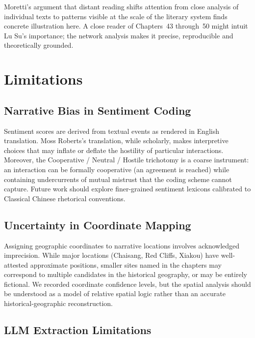 \documentclass[12pt, a4paper]{article}
\begin{document}
Moretti's argument that distant reading shifts attention from close analysis
of individual texts to patterns visible at the scale of the literary system
\autocite{moretti2005graphs} finds concrete illustration here.
A close reader of Chapters~43 through~50 might intuit Lu Su's importance;
the network analysis makes it precise, reproducible and theoretically
grounded.

\section{Limitations}
\label{sec:limitations}

\subsection{Narrative Bias in Sentiment Coding}

Sentiment scores are derived from textual events as rendered in English
translation.
Moss Roberts's translation, while scholarly, makes interpretive choices
that may inflate or deflate the hostility of particular interactions.
Moreover, the Cooperative / Neutral / Hostile trichotomy is a coarse
instrument: an interaction can be formally cooperative (an agreement is
reached) while containing undercurrents of mutual mistrust that the
coding scheme cannot capture.
Future work should explore finer-grained sentiment lexicons calibrated
to Classical Chinese rhetorical conventions.

\subsection{Uncertainty in Coordinate Mapping}

Assigning geographic coordinates to narrative locations involves
acknowledged imprecision.
While major locations (Chaisang, Red Cliffs, Xiakou) have well-attested
approximate positions, smaller sites named in the chapters may correspond
to multiple candidates in the historical geography, or may be entirely
fictional.
We recorded coordinate confidence levels, but the spatial analysis should
be understood as a model of relative spatial logic rather than an accurate
historical-geographic reconstruction.

\subsection{LLM Extraction Limitations}
\end{document}
